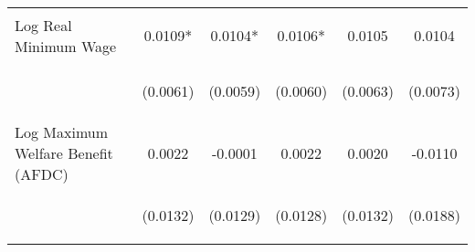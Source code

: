 \begin{center}
\begin{tabular}{lccccc}
\noalign{\smallskip}Log Real Minimum Wage & \begin{scriptsize}0.0109*\end{scriptsize} & \begin{scriptsize}0.0104*\end{scriptsize} & \begin{scriptsize}0.0106*\end{scriptsize} & \begin{scriptsize}0.0105\end{scriptsize} & \begin{scriptsize}0.0104\end{scriptsize}\\
 & \begin{scriptsize}(0.0061)\end{scriptsize} & \begin{scriptsize}(0.0059)\end{scriptsize} & \begin{scriptsize}(0.0060)\end{scriptsize} & \begin{scriptsize}(0.0063)\end{scriptsize} & \begin{scriptsize}(0.0073)\end{scriptsize}\\
\noalign{\smallskip}Log Maximum Welfare Benefit (AFDC) & \begin{scriptsize}0.0022\end{scriptsize} & \begin{scriptsize}-0.0001\end{scriptsize} & \begin{scriptsize}0.0022\end{scriptsize} & \begin{scriptsize}0.0020\end{scriptsize} & \begin{scriptsize}-0.0110\end{scriptsize}\\
 & \begin{scriptsize}(0.0132)\end{scriptsize} & \begin{scriptsize}(0.0129)\end{scriptsize} & \begin{scriptsize}(0.0128)\end{scriptsize} & \begin{scriptsize}(0.0132)\end{scriptsize} & \begin{scriptsize}(0.0188)\end{scriptsize}\\

\end{tabular}
\end{center}
